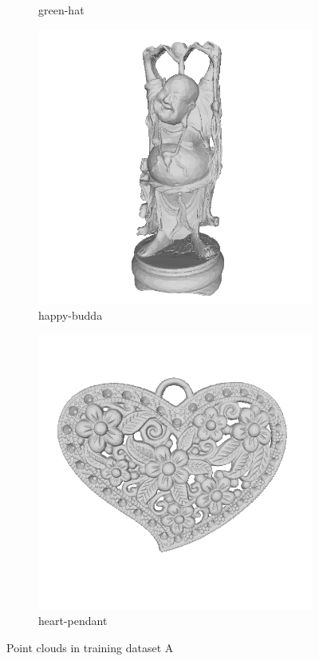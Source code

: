 \begin{figure}[!h]
\begin{subfigure}[b]{0.23\linewidth}
		\caption{green-hat}
	\end{subfigure}
	\begin{subfigure}[b]{0.23\linewidth}
		\includegraphics[width=\linewidth]{./Figures/train-dataset/22.happy-buddha.png}
		\caption{happy-budda}
	\end{subfigure}
	\begin{subfigure}[b]{0.23\linewidth}
		\includegraphics[width=\linewidth]{./Figures/train-dataset/23.heart-pendant.png}
		\caption{heart-pendant}
	\end{subfigure}


	\label{fig:dataset_a}
\caption{Point clouds in training dataset A }
\end{figure}
